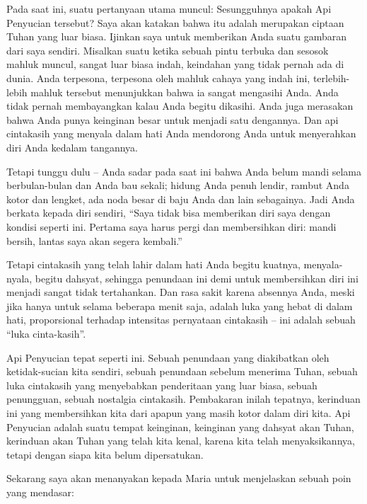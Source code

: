 Pada saat ini, suatu pertanyaan utama muncul: Sesungguhnya apakah Api Penyucian tersebut? Saya akan katakan bahwa itu adalah merupakan ciptaan Tuhan yang luar biasa. Ijinkan saya untuk memberikan Anda suatu gambaran dari saya sendiri. Misalkan suatu ketika sebuah pintu terbuka dan sesosok mahluk muncul, sangat luar biasa indah, keindahan yang tidak pernah ada di dunia. Anda terpesona, terpesona oleh mahluk cahaya yang indah ini, terlebih-lebih mahluk tersebut menunjukkan bahwa ia sangat mengasihi Anda. Anda tidak pernah membayangkan kalau Anda begitu dikasihi. Anda juga merasakan bahwa Anda punya keinginan besar untuk menjadi satu dengannya. Dan api cintakasih yang menyala dalam hati Anda mendorong Anda untuk menyerahkan diri Anda kedalam tangannya.

Tetapi tunggu dulu -- Anda sadar pada saat ini bahwa Anda belum mandi selama berbulan-bulan dan Anda bau sekali; hidung Anda penuh lendir, rambut Anda kotor dan lengket, ada noda besar di baju Anda dan lain sebagainya. Jadi Anda berkata kepada diri sendiri, ``Saya tidak bisa memberikan diri saya dengan kondisi seperti ini. Pertama saya harus pergi dan membersihkan diri: mandi bersih, lantas saya akan segera kembali.''

Tetapi cintakasih yang telah lahir dalam hati Anda begitu kuatnya, menyala-nyala, begitu dahsyat, sehingga penundaan ini demi untuk membersihkan diri ini menjadi sangat tidak tertahankan. Dan rasa sakit karena absennya Anda, meski jika hanya untuk selama beberapa menit saja, adalah luka yang hebat di dalam hati, proporsional terhadap intensitas pernyataan cintakasih -- ini adalah sebuah ``luka cinta-kasih''.

Api Penyucian tepat seperti ini. Sebuah penundaan yang diakibatkan oleh ketidak-sucian kita sendiri, sebuah penundaan sebelum menerima Tuhan, sebuah luka cintakasih yang menyebabkan penderitaan yang luar biasa, sebuah penungguan, sebuah nostalgia cintakasih. Pembakaran inilah tepatnya, kerinduan ini yang membersihkan kita dari apapun yang masih kotor dalam diri kita. Api Penyucian adalah suatu tempat keinginan, keinginan yang dahsyat akan Tuhan, kerinduan akan Tuhan yang telah kita kenal, karena kita telah menyaksikannya, tetapi dengan siapa kita belum dipersatukan.

Sekarang saya akan menanyakan kepada Maria untuk menjelaskan sebuah poin yang mendasar:


